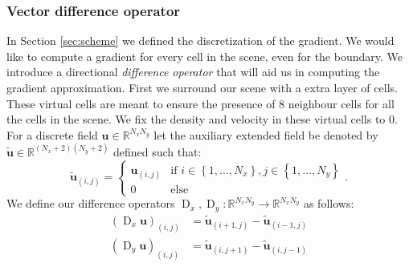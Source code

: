 \documentclass{article}
\let\oldtil\tilde
\DeclareMathOperator{\D}{D}
\renewcommand{\vec}[1]{\mathbf{#1}}
\renewcommand{\tilde}[1]{\oldtil{\mathbf{#1}}}
\begin{document}
\subsubsection{Vector difference operator}
In Section \ref{sec:scheme} we defined the discretization of the gradient. We would like to compute a gradient for every cell in the scene, even for the boundary. We introduce a directional \emph{difference operator} that will aid us in computing the gradient approximation. First we surround our scene with a extra layer of cells. These virtual cells are meant to ensure the presence of 8 neighbour cells for all the cells in the scene. We fix the density and velocity in these virtual cells to 0. 
For a discrete field $\vec{u}\in \mathbb{R}^{N_xN_y}$ let the auxiliary extended field be denoted by $\vec{\tilde{u}} \in \mathbb{R}^{(N_x+2)(N_y+2)}$ defined such that:
\begin{equation}
	\vec{\tilde{u}}_{(i,j)} = \begin{cases}
		\vec{u}_{(i,j)}&\mbox{if } i \in \left\{ 1,\dots,N_x \right\},j \in \left\{ 1,\dots,N_y \right\} \\
		0&\mbox{else}
	\end{cases}.
	\label{def:gradient}
\end{equation}
We define our difference operators $\D_x, \D_y:\mathbb{R}^{N_xN_y}\to\mathbb{R}^{N_xN_y}$ as follows:
\begin{align*}
	\left( \D_x\vec{u} \right)_{(i,j)} &= \vec{\tilde{u}}_{(i+1,j)}-\vec{\tilde{u}}_{(i-1,j)}\\
	\left( \D_y\vec{u} \right)_{(i,j)}  &= \vec{\tilde{u}}_{(i,j+1)}-\vec{\tilde{u}}_{(i,j-1)}
\end{align*}
\end{document}
